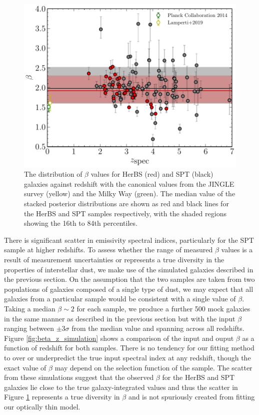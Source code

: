 \begin{figure}
	\centering
	\includegraphics[width=0.75\columnwidth]{Figures/beta_evolution.pdf}
	\caption[Distribution of HerBS and SPT galaxies in the $\beta$ - redshift plane]{The distribution of $\beta$ values for HerBS (red) and SPT (black) galaxies against redshift with the canonical values from the JINGLE survey (yellow) and the Milky Way (green). The median value of the stacked posterior distributions are shown as red and black lines for the HerBS and SPT samples respectively, with the shaded regions showing the 16th to 84th percentiles.}
	\label{fig:beta_z_evolution}
\end{figure}

There is significant scatter in emissivity spectral indices, particularly for the SPT sample at higher redshifts. To assess whether the range of measured $\beta$ values is a result of measurement uncertainties or represents a true diversity in the properties of interstellar dust, we make use of the simulated galaxies described in the previous section. On the assumption that the two samples are taken from two populations of galaxies composed of a single type of dust, we may expect that all galaxies from a particular sample would be consistent with a single value of $\beta$. Taking a median $\beta \sim 2$ for each sample, we produce a further {\color{red} 500} mock galaxies in the same manner as described in the previous section but with the input $\beta$ ranging between $\pm 3\sigma$ from the median value and spanning across all redshifts. Figure \ref{fig:beta_z_simulation} shows a comparison of the input and ouput $\beta$ as a function of redshift for both samples. There is no tendency for our fitting method to over or underpredict the true input spectral index at any redshift, though the exact value of $\beta$ may depend on the selection function of the sample. The scatter from these simulations suggest that the observed $\beta$ for the HerBS and SPT galaxies lie close to the true galaxy-integrated values and thus the scatter in Figure \ref{fig:beta_z_evolution} represents a true diversity in $\beta$ and is not spuriously created from fitting our optically thin model.

